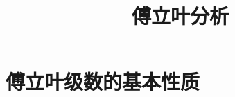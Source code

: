 \documentclass{book}
\begin{document}
\title{傅立叶分析}
\maketitle

\chapter{傅立叶级数的基本性质}


\cite{stein2003}


\end{document}
